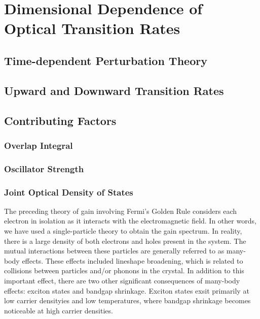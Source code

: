 \chapter{Dimensional Dependence of Optical Transition Rates} \label{RM}
 
\section{Time-dependent Perturbation Theory} \label{dust_seds}

\subsection{} \label{dust_corrections}


\section{Upward and Downward Transition Rates} \label{mbh_seds}

\section{Contributing Factors} \label{BH_conclusions}
\subsection{Overlap Integral}
\subsection{Oscillator Strength}
\subsection{Joint Optical Density of States}
The preceding theory of gain involving Fermi's Golden Rule considers each electron in isolation as it interacts with the electromagnetic field. In other words, we have used a single-particle theory to obtain the gain spectrum. In reality, there is a large density of both electrons and holes present in the system. The mutual interactions between these particles are generally referred to as many-body effects. These effects included lineshape broadening, which is related to collisions between particles and/or phonons in the crystal. In addition to this important effect, there are two other significant consequences of many-body effects: exciton states and bandgap shrinkage. Exciton states exsit primarily at low carrier densityies and low temperatures, where bandgap shrinkage becomes noticeable at high carrier densities.

